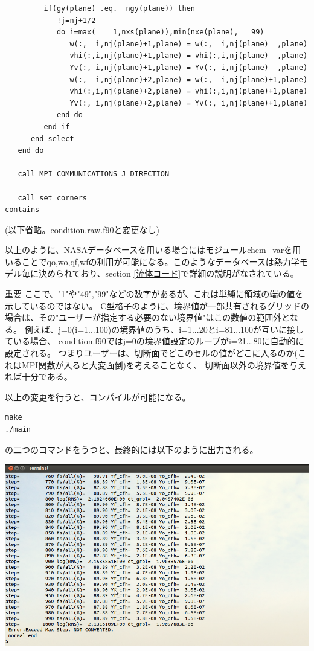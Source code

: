 \documentclass{jsarticle}
\begin{document}
\begin{verbatim}
         if(gy(plane) .eq.  ngy(plane)) then
            !j=nj+1/2
            do i=max(    1,nxs(plane)),min(nxe(plane),   99)
               w(:,  i,nj(plane)+1,plane) = w(:,  i,nj(plane)  ,plane)
               vhi(:,i,nj(plane)+1,plane) = vhi(:,i,nj(plane)  ,plane)
               Yv(:, i,nj(plane)+1,plane) = Yv(:, i,nj(plane)  ,plane)
               w(:,  i,nj(plane)+2,plane) = w(:,  i,nj(plane)+1,plane)
               vhi(:,i,nj(plane)+2,plane) = vhi(:,i,nj(plane)+1,plane)
               Yv(:, i,nj(plane)+2,plane) = Yv(:, i,nj(plane)+1,plane)
            end do
         end if
      end select
   end do

   call MPI_COMMUNICATIONS_J_DIRECTION

   call set_corners
contains

\end{verbatim}%

(以下省略。condition.raw.f90と変更なし)


\hspace{1em}


以上のように、NASAデータベースを用いる場合にはモジュールchem\_varを用いることでqo,wo,qf,wfの利用が可能になる。このようなデータベースは熱力学モデル毎に決められており、section \ref{流体コード}で詳細の説明がなされている。

\begin{itembox}[l]{重要}
ここで、"1"や"49","99"などの数字があるが、これは単純に領域の端の値を示しているのではない。
C型格子のように、境界値が一部共有されるグリッドの場合は、その"ユーザーが指定する必要のない境界値"はこの数値の範囲外となる。
例えば、j=0(i=1...100)の境界値のうち、i=1...20とi=81...100が互いに接している場合、
condition.f90ではj=0の境界値設定のループがi=21...80に自動的に設定される。
つまりユーザーは、切断面でどこのセルの値がどこに入るのか(これはMPI関数が入ると大変面倒)を考えることなく、
切断面以外の境界値を与えれば十分である。
\end{itembox}

以上の変更を行うと、コンパイルが可能になる。
\begin{verbatim}
make
./main
\end{verbatim}
の二つのコマンドをうつと、最終的には以下のように出力される。
\begin{center}
\includegraphics[width=.8\textwidth,bb=0 0 962 577]{tutorial_img/200.png}
\end{center}
\end{document}
